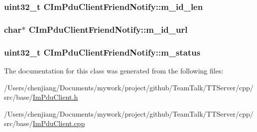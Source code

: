 \subsubsection[{m\+\_\+id\+\_\+len}]{\setlength{\rightskip}{0pt plus 5cm}uint32\+\_\+t C\+Im\+Pdu\+Client\+Friend\+Notify\+::m\+\_\+id\+\_\+len\hspace{0.3cm}{\ttfamily [private]}}\label{class_c_im_pdu_client_friend_notify_a90f609019d916551b1235939cdcd4c51}
\hypertarget{class_c_im_pdu_client_friend_notify_aa633e826c2b035c4164bc4e06d5960b5}{}
\subsubsection[{m\+\_\+id\+\_\+url}]{\setlength{\rightskip}{0pt plus 5cm}char$\ast$ C\+Im\+Pdu\+Client\+Friend\+Notify\+::m\+\_\+id\+\_\+url\hspace{0.3cm}{\ttfamily [private]}}\label{class_c_im_pdu_client_friend_notify_aa633e826c2b035c4164bc4e06d5960b5}
\hypertarget{class_c_im_pdu_client_friend_notify_a13b9d87e80a9c1354988f540d0a1b5e4}{}
\subsubsection[{m\+\_\+status}]{\setlength{\rightskip}{0pt plus 5cm}uint32\+\_\+t C\+Im\+Pdu\+Client\+Friend\+Notify\+::m\+\_\+status\hspace{0.3cm}{\ttfamily [private]}}\label{class_c_im_pdu_client_friend_notify_a13b9d87e80a9c1354988f540d0a1b5e4}


The documentation for this class was generated from the following files\+:\begin{DoxyCompactItemize}
\item 
/\+Users/chenjiang/\+Documents/mywork/project/github/\+Team\+Talk/\+T\+T\+Server/cpp/src/base/\hyperlink{_im_pdu_client_8h}{Im\+Pdu\+Client.\+h}\item 
/\+Users/chenjiang/\+Documents/mywork/project/github/\+Team\+Talk/\+T\+T\+Server/cpp/src/base/\hyperlink{_im_pdu_client_8cpp}{Im\+Pdu\+Client.\+cpp}\end{DoxyCompactItemize}
